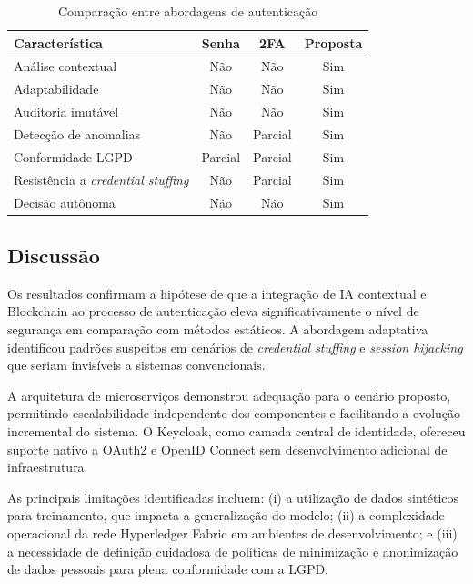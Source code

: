 \documentclass[12pt,a4paper]{article}
\begin{document}
\begin{table}[H]
\centering
\caption{Comparação entre abordagens de autenticação}
\label{tab:comparison}
\begin{tabular}{@{}lccc@{}}
\toprule
\textbf{Característica} & \textbf{Senha} & \textbf{2FA} & \textbf{Proposta} \\
\midrule
Análise contextual       & Não & Não & Sim \\
Adaptabilidade           & Não & Não & Sim \\
Auditoria imutável       & Não & Não & Sim \\
Detecção de anomalias    & Não & Parcial & Sim \\
Conformidade LGPD        & Parcial & Parcial & Sim \\
Resistência a \textit{credential stuffing} & Não & Parcial & Sim \\
Decisão autônoma         & Não & Não & Sim \\
\bottomrule
\end{tabular}
\end{table}

\subsection{Discussão}

Os resultados confirmam a hipótese de que a integração de IA contextual e Blockchain ao processo de autenticação eleva significativamente o nível de segurança em comparação com métodos estáticos. A abordagem adaptativa identificou padrões suspeitos em cenários de \textit{credential stuffing} e \textit{session hijacking} que seriam invisíveis a sistemas convencionais.

A arquitetura de microserviços demonstrou adequação para o cenário proposto, permitindo escalabilidade independente dos componentes e facilitando a evolução incremental do sistema. O Keycloak, como camada central de identidade, ofereceu suporte nativo a OAuth2 e OpenID Connect sem desenvolvimento adicional de infraestrutura.

As principais limitações identificadas incluem: (i) a utilização de dados sintéticos para treinamento, que impacta a generalização do modelo; (ii) a complexidade operacional da rede Hyperledger Fabric em ambientes de desenvolvimento; e (iii) a necessidade de definição cuidadosa de políticas de minimização e anonimização de dados pessoais para plena conformidade com a LGPD.

\end{document}
